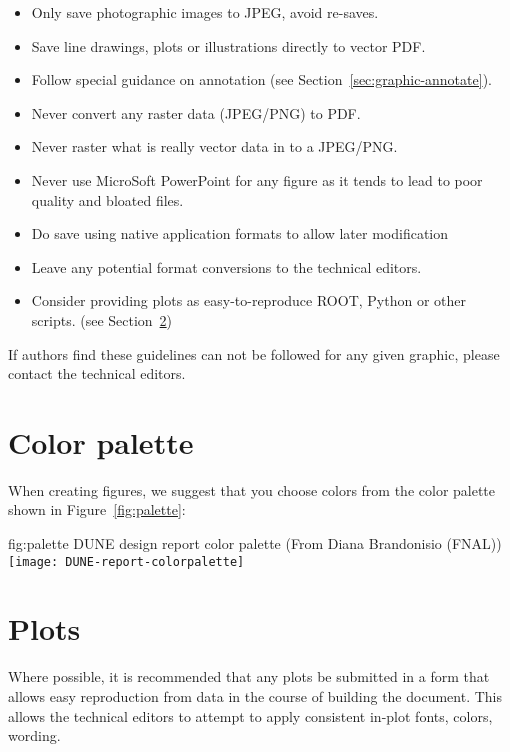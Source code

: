 \begin{itemize}
\item Only save photographic images to JPEG, avoid re-saves.
\item Save line drawings, plots or illustrations directly to vector PDF.
\item Follow special guidance on annotation (see Section~\ref{sec:graphic-annotate}).
\item Never convert any raster data (JPEG/PNG) to PDF.
\item Never raster what is really vector data in to a JPEG/PNG.
\item Never use MicroSoft PowerPoint for any figure as it tends to lead to poor quality and bloated files.
\item Do save using native application formats to allow later
  modification
\item Leave any potential format conversions to the technical editors.
\item Consider providing plots as easy-to-reproduce ROOT, Python or
  other scripts.
  (see Section~\ref{sec:graphic-plots})
\end{itemize}

\noindent If authors find these guidelines can not be followed for any
given graphic, please contact the technical editors.   

\section{Color palette}
\label{sec:graphic-plots}

When creating figures, we suggest that you choose colors from the color palette shown in Figure~\ref{fig:palette}:

\begin{dunefigure}{fig:palette}
     {DUNE design report color palette (From Diana Brandonisio (FNAL))}
    \texttt{[image: DUNE-report-colorpalette]}
    \end{dunefigure}

\section{Plots}
\label{sec:graphic-plots}

Where possible, it is recommended that any plots be submitted in a
form that allows easy reproduction from data in the course of building
the document.
This allows the technical editors to attempt to apply consistent
in-plot fonts, colors, wording.

